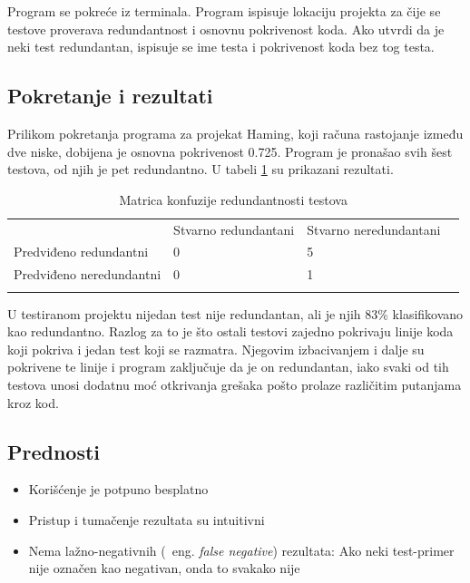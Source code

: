 \documentclass[a4paper]{article}
\begin{document}
Program se pokreće iz terminala. Program ispisuje lokaciju projekta za čije se testove proverava redundantnost i osnovnu pokrivenost koda.
Ako utvrdi da je neki test redundantan, ispisuje se ime testa i pokrivenost koda bez tog testa.

\subsection{Pokretanje i rezultati}
\label{subsec:pokretanje_rezultati}

Prilikom pokretanja programa za projekat Haming, koji računa rastojanje između dve niske, dobijena je osnovna pokrivenost 0.725. 
Program je pronašao svih šest testova, od njih je pet redundantno. 
U tabeli \ref{tab:tabela} su prikazani rezultati.

\begin{table}[!htbp]
    \centering
    \begin{tabular}{llll}
        & Stvarno redundantani & Stvarno neredundantani &   \\
        Predviđeno redundantni  & 0 & 5 &   \\
        Predviđeno neredundantni & 0 & 1 &   \\
        &   &   &  
    \end{tabular}
    \caption{Matrica konfuzije redundantnosti testova}
    \label{tab:tabela}
\end{table}

U testiranom projektu nijedan test nije redundantan, ali je njih 83\% klasifikovano kao redundantno.
Razlog za to je što ostali testovi zajedno pokrivaju linije koda koji pokriva i jedan test koji se razmatra.
Njegovim izbacivanjem i dalje su pokrivene te linije i program zaključuje da je on redundantan, iako svaki od tih 
testova unosi dodatnu moć otkrivanja grešaka pošto prolaze različitim putanjama kroz kod.



\subsection{Prednosti}
\label{subsec:prednosti}
\begin{itemize}
    \item Korišćenje je potpuno besplatno
    \item Pristup i tumačenje rezultata su intuitivni
    \item Nema lažno-negativnih (~eng. \textit{false negative}) rezultata: Ako neki test-primer nije označen kao negativan, onda to svakako nije
\end{itemize}
\end{document}
